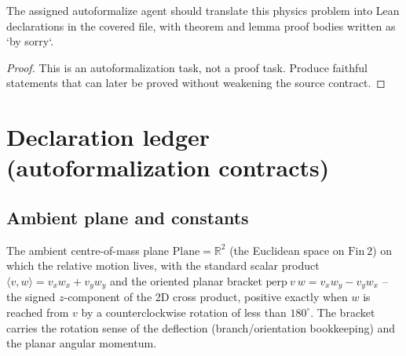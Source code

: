 \begin{theorem}
\label{thm:physics:IPhO_2026_1_B_2:target}
The assigned autoformalize agent should translate this physics problem into Lean declarations in the covered file, with theorem and lemma proof bodies written as `by sorry`.
\end{theorem}
\begin{proof}
This is an autoformalization task, not a proof task. Produce faithful statements that can later be proved without weakening the source contract.
\end{proof}


\section*{Declaration ledger (autoformalization contracts)}

\subsection*{Ambient plane and constants}

\begin{definition}
\label{def:IPhO2026Problems_problem_IPhO_2026_1_B_2:Plane}
The ambient centre-of-mass plane $\mathrm{Plane} = \mathbb{R}^2$ (the
Euclidean space on $\mathrm{Fin}\ 2$) on which the relative motion lives,
with the standard scalar product $\langle v, w\rangle = v_x w_x + v_y w_y$
and the oriented planar bracket $\mathrm{perp}\ v\ w = v_x w_y - v_y w_x$ --
the signed $z$-component of the 2D cross product, positive exactly when $w$
is reached from $v$ by a counterclockwise rotation of less than
$180^{\circ}$.  The bracket carries the rotation sense of the deflection
(branch/orientation bookkeeping) and the planar angular momentum.
\end{definition}

